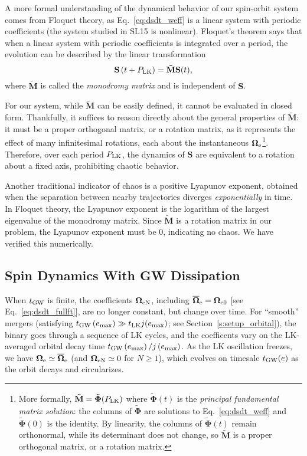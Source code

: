 \documentclass[
        twocolumn,
        twocolappendix
    ]{aastex63}
\renewcommand*{\bm}[1]{\boldsymbol{\mathbf{#1}}}
\newcommand*{\p}[1]{\left(#1\right)}
\begin{document}
A more formal understanding of the dynamical behavior of our spin-orbit system
comes from Floquet theory\citep{floquet1883equations, kuchment2012floquet}, as
Eq.~\eqref{eq:dsdt_weff} is a linear system with periodic coefficients (the
system studied in SL15 is nonlinear). Floquet's theorem says that when a linear
system with periodic coefficients is integrated over a period, the evolution can
be described by the linear transformation
\begin{equation}
    \bm{S}\p{t + P_{\rm LK}} = \bm{\tilde{M}} \bm{S}(t),
\end{equation}
where $\bm{\tilde{M}}$ is called the \emph{monodromy matrix} and is independent
of $\bm{S}$.

For our system, while $\bm{\tilde{M}}$ can be easily defined, it cannot be evaluated in closed
form. Thankfully, it suffices to reason directly about the general properties of
$\bm{\tilde{M}}$: it must be a proper orthogonal
matrix, or a rotation matrix, as it represents the effect of many infinitesimal
rotations, each about the instantaneous $\bm{\Omega}_{\rm e}$\footnote{More
formally, $\bm{\tilde{M}} = \bm{\tilde{\Phi}}(P_{\rm LK})$ where
$\bm{\tilde{\Phi}}(t)$ is the \emph{principal fundamental matrix solution}: the
columns of $\bm{\tilde{\Phi}}$ are solutions to Eq.~\eqref{eq:dsdt_weff} and
$\bm{\tilde{\Phi}}(0)$ is the identity. By linearity, the columns of
$\bm{\tilde{\Phi}}(t)$ remain orthonormal, while its determinant does not
change, so $\bm{\tilde{M}}$ is a proper orthogonal matrix, or a rotation
matrix.}. Therefore, over each period $P_{\rm LK}$, the dynamics of
$\bm{S}$ are equivalent to a rotation about a fixed axis,
prohibiting chaotic behavior.

Another traditional indicator of chaos is a positive Lyapunov exponent, obtained
when the separation between nearby trajectories diverges \emph{exponentially} in
time. In Floquet theory, the Lyapunov exponent is the logarithm of the largest
eigenvalue of the monodromy matrix. Since $\bm{\tilde{M}}$ is a rotation matrix
in our problem, the Lyapunov exponent must be $0$, indicating no chaos. We have
verified this numerically.

\subsection{Spin Dynamics With GW Dissipation}

When $t_{\rm GW}$ is finite, the coefficients $\bm{\Omega}_{\rm eN}$, including
$\bm{\overline{\Omega}}_{\rm e} = \bm{\Omega}_{\rm e0}$ [see
Eq.~\eqref{eq:dsdt_fullft}], are no longer constant, but change over time. For
``smooth'' mergers (satisfying $t_{\rm GW}\p{e_{\max}} \gg t_{\rm LK}
j(e_{\max})$; see Section~\ref{s:setup_orbital}), the binary goes through a
sequence of LK cycles, and the coefficents vary on the LK-averaged orbital decay
time $t_{\rm GW}\p{e_{\max}} / j\p{e_{\max}}$. As the LK oscillation freezes, we
have $\bm{\Omega}_{\rm e} \simeq \bm{\overline{\Omega}}_{\rm e}$ (and
$\bm{\Omega}_{\rm eN} \simeq 0$ for $N \geq 1$), which evolves on timesale
$t_{\rm GW}(e)$ as the orbit decays and circularizes.
\end{document}

